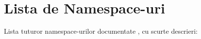 \section{Lista de Namespace-\/uri}
Lista tuturor namespace-\/urilor documentate , cu scurte descrieri\+:\begin{DoxyCompactList}
\item{}
\end{DoxyCompactList}
